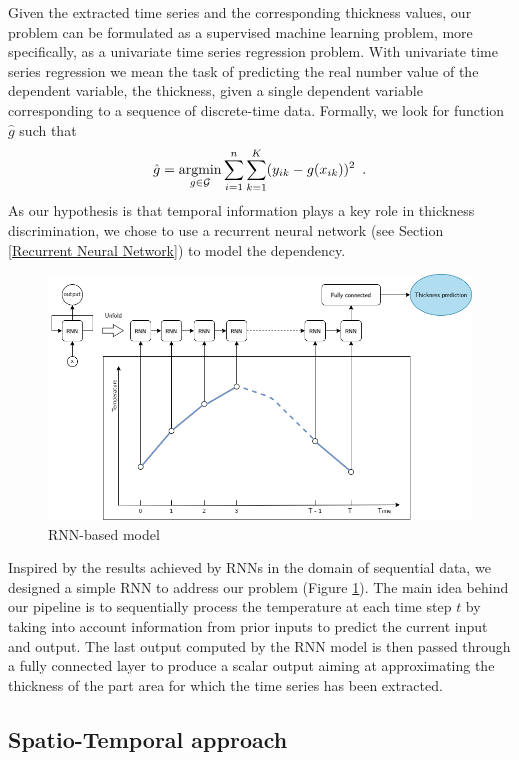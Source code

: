 Given the extracted time series and the corresponding thickness values, our problem can be formulated as a supervised machine learning problem, more specifically, as a univariate time series regression problem. With univariate time series regression we mean the task of predicting the real number value of the dependent variable, the thickness, given a single dependent variable corresponding to a sequence of discrete-time data. Formally, we look for function $\hat{g}$ such that
\begin{equation}
    \hat{g} = \operatorname*{argmin}_{g\in\mathcal{G}} \sum_{i=1}^n \sum_{k=1}^K (y_{ik} - g(x_{ik}))^2 \enspace.
\end{equation}
%
As our hypothesis is that temporal information plays a key role in thickness discrimination, we chose to use a recurrent neural network (see Section \ref{Recurrent Neural Network}) to model the dependency. 
%
\begin{figure}
\centering
\includegraphics[scale=0.45]{images/chapter_4/rnn_model.png}
\caption{RNN-based model}
\label{fig:rnn_model}
\end{figure}
%
Inspired by the results achieved by RNNs in the domain of sequential data, we designed a simple RNN to address our problem (Figure \ref{fig:rnn_model}). The main idea behind our pipeline is to sequentially process the temperature at each time step $t$ by taking into account information from prior inputs to predict the current input and output. The last output computed by the RNN model is then passed through a fully connected layer to produce a scalar output aiming at approximating the thickness of the part area for which the time series has been extracted.

\subsection{Spatio-Temporal approach} \label{Spatio-temporal approach}

